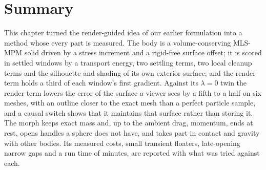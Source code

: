
\section{Summary}
\label{ch4:sec_summary}

This chapter turned the render-guided idea of our earlier formulation into a method whose every part is measured. The
body is a volume-conserving MLS-MPM solid driven by a stress increment and a rigid-free surface offset; it is scored in
settled windows by a transport energy, two settling terms, two local cleanup terms and the silhouette and shading of its
own exterior surface; and the render term holds a third of each window's first gradient. Against its $\lambda=0$ twin the render term
lowers the error of the surface a viewer sees by a fifth to a half on six meshes, with an outline closer to the exact
mesh than a perfect particle sample, and a causal switch shows that it maintains that surface rather than storing it. The morph keeps
exact mass and, up to the ambient drag, momentum, ends at rest, opens handles a sphere does not have, and takes part in
contact and gravity with other bodies. Its measured costs, small transient floaters, late-opening narrow gaps and a run
time of minutes, are reported with what was tried against each.

